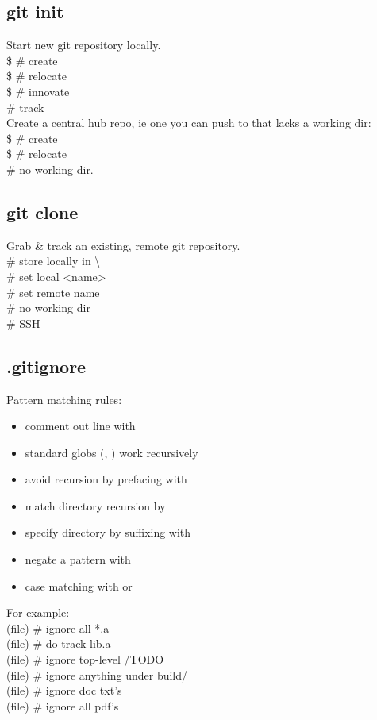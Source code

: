 \subsection*{git init}
Start new git repository locally. \\
\$  \# create \\
\$  \# relocate \\
\$  \# innovate \\
 \# track \\
Create a central hub repo, ie one you can push to that lacks a working dir: \\
\$  \# create \\
\$  \# relocate \\
 \# no working dir.


\subsection*{git clone}
Grab \& track an existing, remote git repository. \\
 \# store locally in \textbackslash \\
 \# set local <name> \\
 \# set remote name\\
 \# no working dir \\
 \# SSH


\subsection*{.gitignore}
Pattern matching rules:
\begin{itemize}
    \item comment out line with \code{\#}
    \item standard globs  (\code{*}, ) work recursively
    \item avoid recursion by prefacing with \code{\textbackslash}
    \item match directory recursion by \code{**}
    \item specify directory by suffixing with \code{\textbackslash}
    \item negate a pattern with \code{!}
    \item case matching with \code{[abc]} or \code{[a-c]}
\end{itemize}
For example: \\
(file)  \# ignore all *.a \\
(file)  \# do track lib.a \\
(file)  \# ignore top-level /TODO\\
(file)  \# ignore anything under build/ \\
(file)  \# ignore doc txt's \\
(file)  \# ignore all pdf's


